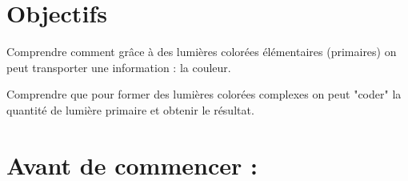\documentclass[12pt,a4paper,notitlepage]{article}
\begin{document}
\begin{flushleft}
\begin{tabular}{| m{0.03\linewidth} | m{0.75\linewidth} || m{0.015\linewidth} | m{0.015\linewidth} | m{0.015\linewidth} | m{0.015\linewidth} || }
	\hline
\end{tabular}
\end{flushleft}

\section*{Objectifs}
Comprendre comment grâce à des lumières colorées élémentaires (primaires) on peut transporter une information : la couleur.

Comprendre que pour former des lumières colorées complexes on peut "coder" la quantité de lumière primaire et obtenir le résultat.

\section*{Avant de commencer :}
\end{document}
